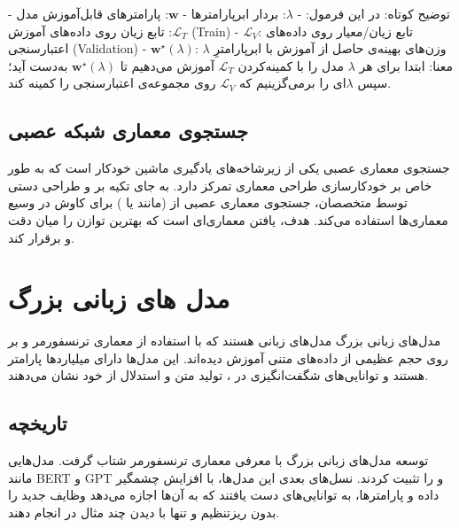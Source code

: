 توضیح کوتاه:
در این فرمول:
- $\lambda$: بردار ابرپارامترها
- $\mathbf{w}$: پارامترهای قابل‌آموزش مدل
- $\mathcal{L}_T$: تابع زیان روی داده‌های آموزش (Train)
- $\mathcal{L}_V$: تابع زیان/معیار روی داده‌های اعتبارسنجی (Validation)
- $\mathbf{w}^\star(\lambda)$: وزن‌های بهینه‌ی حاصل از آموزش با ابرپارامترِ $\lambda$
معنا: ابتدا برای هر $\lambda$ مدل را با کمینه‌کردن $\mathcal{L}_T$ آموزش می‌دهیم تا $\mathbf{w}^\star(\lambda)$ به‌دست آید؛
سپس $\lambda$ای را برمی‌گزینیم که $\mathcal{L}_V$ روی مجموعه‌ی اعتبارسنجی را کمینه کند.

\subsection{جستجوی معماری شبکه عصبی}
جستجوی معماری عصبی یکی از زیرشاخه‌های یادگیری ماشین خودکار است که به طور خاص بر خودکارسازی طراحی معماری  تمرکز دارد. به جای تکیه بر  و طراحی دستی توسط متخصصان، جستجوی معماری عصبی از  (مانند  یا ) برای کاوش در  وسیع معماری‌ها استفاده می‌کند. هدف، یافتن معماری‌ای است که بهترین توازن را میان دقت و  برقرار کند.

\section{مدل های زبانی بزرگ}
مدل‌های زبانی بزرگ مدل‌های زبانی هستند که با استفاده از معماری ترنسفورمر و بر روی حجم عظیمی از داده‌های متنی آموزش دیده‌اند. این مدل‌ها دارای میلیاردها پارامتر هستند و توانایی‌های شگفت‌انگیزی در ، تولید متن  و استدلال از خود نشان می‌دهند.

\subsection{تاریخچه}
توسعه مدل‌های زبانی بزرگ با معرفی معماری ترنسفورمر \cite{vaswani2017attention} شتاب گرفت. مدل‌هایی مانند BERT \cite{devlin2019bert} و GPT \cite{brown2020language}   و  را تثبیت کردند. نسل‌های بعدی این مدل‌ها، با افزایش چشمگیر  داده و پارامترها، به توانایی‌های  دست یافتند که به آن‌ها اجازه می‌دهد وظایف جدید را بدون ریزتنظیم و تنها با دیدن چند مثال در  انجام دهند.

